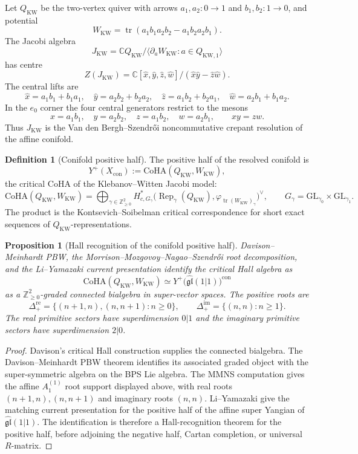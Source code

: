 \documentclass[11pt]{amsart}
\providecommand{\C}{\mathbb{C}}
\providecommand{\Z}{\mathbb{Z}}
\providecommand{\fgl}{\mathfrak{gl}}
\providecommand{\CoHA}{\mathrm{CoHA}}
\theoremstyle{plain}
\newtheorem{proposition}[theorem]{Proposition}
\theoremstyle{definition}
\newtheorem{definition}[theorem]{Definition}
\theoremstyle{remark}
\begin{document}
Let $Q_{\mathrm{KW}}$ be the two-vertex quiver with arrows
$a_1,a_2\colon 0\to 1$ and $b_1,b_2\colon 1\to 0$, and potential
\[
  W_{\mathrm{KW}}
  =
  \operatorname{tr}(a_1b_1a_2b_2-a_1b_2a_2b_1).
\]
The Jacobi algebra
\[
  J_{\mathrm{KW}}
  =
  \C Q_{\mathrm{KW}}/
  \langle \partial_a W_{\mathrm{KW}} : a\in Q_{\mathrm{KW},1}\rangle
\]
has centre
\[
  Z(J_{\mathrm{KW}})
  =
  \C[\widehat x,\widehat y,\widehat z,\widehat w]/
  (\widehat x\widehat y-\widehat z\widehat w).
\]
The central lifts are
\[
  \widehat x=a_1b_1+b_1a_1,\quad
  \widehat y=a_2b_2+b_2a_2,\quad
  \widehat z=a_1b_2+b_2a_1,\quad
  \widehat w=a_2b_1+b_1a_2.
\]
In the $e_0$ corner the four central generators restrict to the mesons
\[
  x=a_1b_1,\quad y=a_2b_2,\quad z=a_1b_2,\quad w=a_2b_1,
  \qquad xy=zw.
\]
Thus $J_{\mathrm{KW}}$ is the Van den Bergh--Szendr\H{o}i
noncommutative crepant resolution of the affine conifold.

\begin{definition}[Conifold positive half]
The positive half of the resolved conifold is
\[
  Y^+(X_{\mathrm{con}})
  :=
  \CoHA(Q_{\mathrm{KW}},W_{\mathrm{KW}}),
\]
the critical CoHA of the Klebanov--Witten Jacobi model:
\[
  \CoHA(Q_{\mathrm{KW}},W_{\mathrm{KW}})
  =
  \bigoplus_{\gamma\in\Z_{\geq0}^2}
  H^{*}_{c,G_\gamma}
  \bigl(\operatorname{Rep}_\gamma(Q_{\mathrm{KW}}),
  \varphi_{\operatorname{tr}(W_{\mathrm{KW}})_\gamma}\bigr)^\vee,
  \qquad
  G_\gamma=\mathrm{GL}_{\gamma_0}\times\mathrm{GL}_{\gamma_1}.
\]
The product is the Kontsevich--Soibelman critical correspondence for
short exact sequences of $Q_{\mathrm{KW}}$-representations.
\end{definition}

\begin{proposition}[Hall recognition of the conifold positive half]
Davison--Meinhardt PBW, the
Morrison--Mozgovoy--Nagao--Szendr\H{o}i root decomposition, and the
Li--Yamazaki current presentation identify the critical Hall algebra as
\[
  \CoHA(Q_{\mathrm{KW}},W_{\mathrm{KW}})
  \simeq
  Y^+\!\bigl(\widehat{\fgl}(1|1)\bigr)^{\mathrm{con}}
\]
as a $\Z_{\geq0}^2$-graded connected bialgebra in super-vector spaces.
The positive roots are
\[
  \Delta_+^{\mathrm{re}}
  =
  \{(n+1,n),(n,n+1):n\geq0\},
  \qquad
  \Delta_+^{\mathrm{im}}=\{(n,n):n\geq1\}.
\]
The real primitive sectors have superdimension $0|1$ and the imaginary
primitive sectors have superdimension $2|0$.
\end{proposition}

\begin{proof}
Davison's critical Hall construction supplies the connected bialgebra.
The Davison--Meinhardt PBW theorem identifies its associated graded
object with the super-symmetric algebra on the BPS Lie algebra.  The
MMNS computation gives the affine $A_1^{(1)}$ root support displayed
above, with real roots $(n+1,n),(n,n+1)$ and imaginary roots $(n,n)$.
Li--Yamazaki give the matching current presentation for the positive
half of the affine super Yangian of $\widehat{\fgl}(1|1)$.  The
identification is therefore a Hall-recognition theorem for the positive
half, before adjoining the negative half, Cartan completion, or
universal $R$-matrix.
\end{proof}
\end{document}
